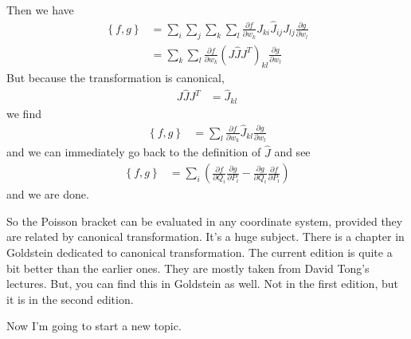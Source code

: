 Then we have
\begin{align}
    \left\{ f, g \right\}
    &=
    \sum_i \sum_j \sum_k \sum_l
    \frac{\partial f}{\partial w_k}
    J_{ki}
    \hat{J}_{ij}
    J_{lj}
    \frac{\partial g}{\partial w_l}\\
    &=
    \sum_k \sum_l
    \frac{\partial f}{\partial w_k}
    \left( J \hat{J} J^T \right)_{kl}
    \frac{\partial g}{\partial w_l}
\end{align}
But because the transformation is canonical,
\begin{align}
    J \hat{J} J^T &= \hat{J}_{kl}
\end{align}
we find
\begin{align}
    \left\{ f, g \right\}
    &=
    \sum_l
    \frac{\partial f}{\partial w_k}
    \hat{J}_{kl}
    \frac{\partial g}{\partial w_l}
\end{align}
and we can immediately go back to the definition of $\hat{J}$ and see
\begin{align}
    \left\{ f, g \right\}
    &=
    \sum_i
    \left( 
    \frac{\partial f}{\partial Q_i}
    \frac{\partial g}{\partial P_i}
    -
    \frac{\partial g}{\partial Q_i}
    \frac{\partial f}{\partial P_i}
    \right)
\end{align}
and we are done.

So the Poisson bracket can be evaluated in any coordinate system,
provided they are related by canonical transformation.
It's a huge subject.
There is a chapter in Goldstein dedicated to canonical transformation.
The current edition is quite a bit better than the earlier ones.
They are mostly taken from David Tong's lectures.
But,
you can find this in Goldstein as well.
Not in the first edition,
but it is in the second edition.

Now I'm going to start a new topic.


